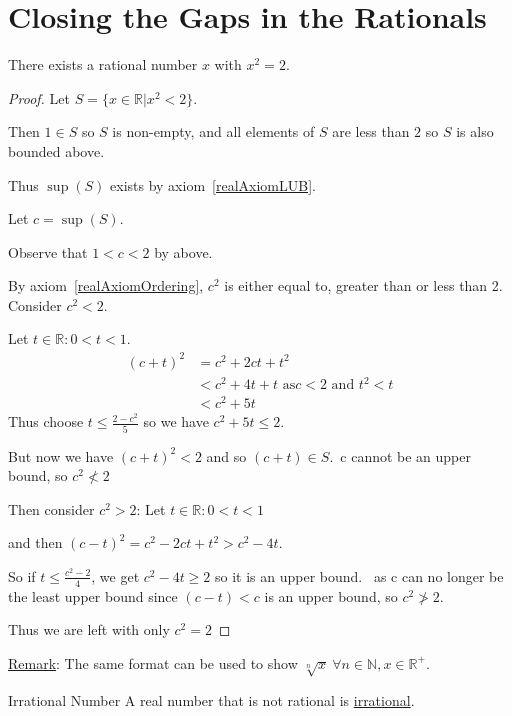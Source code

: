 \documentclass[../Main.tex]{subfiles}
\begin{document}
\section{Closing the Gaps in the Rationals}
\begin{theorem}
    There exists a rational number $x$ with $x^2 = 2$.
\end{theorem}
\begin{proof}
    Let $S = \{x \in \mathbb{R} | x^2 < 2\}$.\par
    Then $1 \in S$ so $S$ is non-empty, and all elements of $S$ are less than $2$ so $S$ is also bounded above.\par
    Thus $\sup(S)$ exists by axiom~\ref{realAxiomLUB}.\par
    Let $c = \sup(S)$.\par
    Observe that $1 < c < 2$ by above.\par
    By axiom~\ref{realAxiomOrdering}, $c^2$ is either equal to, greater than or less than 2.
    Consider $c^2 < 2$.\par
    Let $t \in \mathbb{R} : 0 < t < 1$.
    \begin{align*}
        (c+t)^2 &= c^2 + 2ct + t^2 \\
        &< c^2 + 4t + t \text{ as} c < 2 \text{ and } t^2 < t \\
        &< c^2 + 5t
    \end{align*}
    Thus choose $t \leq \frac{2-c^2}{5}$ so we have $c^2 + 5t \leq 2$.\par
    But now we have $(c+t)^2 < 2$ and so $(c+t) \in S$.\contradiction~c cannot be an upper bound, so $c^2 \nless 2$\par
    Then consider $c^2 > 2$:
    Let $t \in \mathbb{R} : 0 < t < 1$\par
    and then $(c - t)^2 = c^2 - 2ct + t^2 > c^2 - 4t$.\par
    So if $t \leq \frac{c^2 - 2}{4}$, we get $c^2 - 4t \geq 2$ so it is an upper bound. \contradiction~as c can no longer be the least upper bound since $(c-t) < c$ is an upper bound, so $c^2 \ngtr 2$.\par
    Thus we are left with only $c^2 = 2$
\end{proof}
\underline{Remark}: The same format can be used to show $\sqrt[n]{x}~\forall n \in \mathbb{N}, x \in \mathbb{R}^+$.\par
\begin{definition}{Irrational Number}
    A real number that is not rational is \underline{irrational}.
\end{definition}
\end{document}
